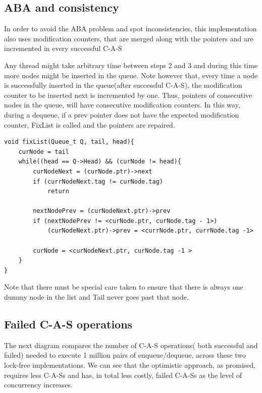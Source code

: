 \subsection{ABA and consistency}

In order to avoid the ABA problem and spot inconsistencies, this implementation also uses modification counters, that are merged along with the pointers and are incremented in every successful C-A-S

Any thread might take arbitrary time  between steps 2 and 3 and during this time more nodes might be inserted in the queue. Note however that, every time a node is successfully inserted in the queue(after successful C-A-S), the modification counter to be inserted next is incremented by one. Thus, pointers of consecutive nodes in the queue, will have consecutive modification counters. In this way, during a dequeue, if a prev pointer does not have the expected modification counter, FixList is called and the pointers are repaired.

\begin{lstlisting}
void fixList(Queue_t Q, tail, head){
	curNode = tail
	while((head == Q->Head) && (curNode != head){
		curNodeNext = (curNode.ptr)->next
		if (currNodeNext.tag != curNode.tag)
			return
		
		nextNodePrev = (curNodeNext.ptr)->prev
		if (nextNodePrev != <curNode.ptr, curNode.tag - 1>)
			(curNodeNext.ptr)->prev = <currNode.ptr, currNode.tag -1>
		
		curNode = <curNodeNext.ptr, curNode.tag -1 >
	}
}
\end{lstlisting}

Note that there must be special care taken to ensure that there is always one dummy node in the list and Tail never goes past that node.

\subsection{Failed C-A-S operations}

The next diagram compares the number of C-A-S operations( both successful and failed) needed to execute 1 million pairs of enqueue/dequeue, across these two lock-free implementations. We can see that the optimistic approach, as promised, requires less C-A-Ss and has, in total less costly, failed C-A-Ss as the level of concurrency increases.

